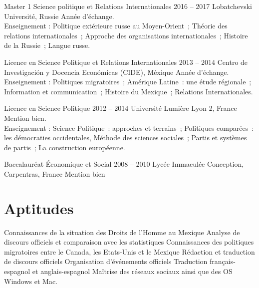 \documentclass[30pt]{tccv}
\begin{document}
\begin{upshape}
\begin{education}
\emergencystretch=5pt

\item[Master 1 Science politique et Relations Internationales]{2016 -- 2017}
     {Lobatchevski Université, Russie}
     {     
     Année d’échange.\\
     Enseignement : Politique extérieure russe au Moyen-Orient ; 
     Théorie des relations internationales ; 
     Approche des orga\-ni\-sa\-tions in\-ternationales ; 
     Histoire de la Russie ; 
     Lan\-gue rus\-se.
     }
    
\item[Licence en Science Politique et Relations Internationales]{2013 -- 2014}
     {Centro de Investigación y Docencia Económicas (CIDE), Méxique}
     {Année d’échange.\\
     Enseignement : Politiques migratoires ; Amérique Latine : une étude régionale ; Information et communication ; Histoire du Mexique ; Relations Internationales.
     }

\item[Licence en Science Politique ]{2012 -- 2014}
     {Université Lumière Lyon 2, France}
     {Mention bien.\\
     Enseignement : Science Politique : approches et terrains ; Politiques comparées : les démocraties
     occidentales, Méthode des sciences sociales ; Partis et systèmes de partis ; La construction européenne. 
     }


\item[Baccalauréat Économique et Social]{2008 -- 2010}
     {Lycée Immaculée Conception, Carpentras, France}
     {Mention bien}
     
\vspace{-0.5cm}     
\section{Aptitudes}
\setlength{\parskip}{0pt}
\begin{itemize}[leftmargin=13pt]
  \setlength\itemsep{-3pt} 
  \fontsize{9pt}{1.1em}\color{text}\upshape\selectfont
  \sloppy
  \cvitem[\checkmark]  Connaissances de la situation des Droits de l’Homme au Mexique
  \cvitem[\checkmark]  Analyse de discours officiels et comparaison avec les statistiques
  \cvitem[\checkmark]  Connaissances des politiques migratoires entre le Canada, les Etats-Unis et le Mexique
  \cvitem[\checkmark]  Rédaction et traduction de discours officiels
  \cvitem[\checkmark]  Organisation d’événements officiels
  \cvitem[\checkmark]  Traduction français-espagnol et anglais-espagnol
  \cvitem[\checkmark]  Maîtrise des réseaux sociaux ainsi que des OS Windows et Mac. 
\end{itemize}




\end{education}
\end{upshape}
\end{document}
